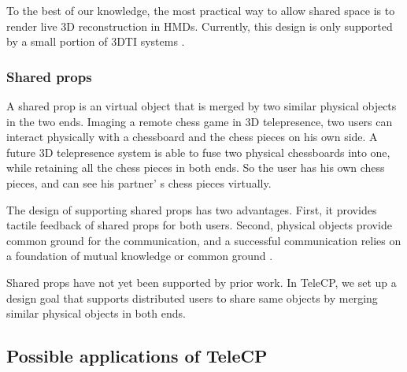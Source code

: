 To the best of our knowledge, the most practical way to allow shared space is to render live 3D reconstruction in HMDs. Currently, this design is only supported by a small portion of 3DTI systems \cite{orts2016holoportation, maimone2013general, lindlbauer2018remixed, smith2018communication}.

\subsubsection{Shared props}

A shared prop is an virtual object that is merged by two similar physical objects in the two ends. Imaging a remote chess game in 3D telepresence, two users can  interact physically with a chessboard and the chess pieces on his own side. A future 3D telepresence system is able to fuse two physical chessboards into one, while retaining all the chess pieces in both ends. So the user has his own chess pieces, and can see his partner' s chess pieces virtually.

The design of supporting shared props has two advantages. First, it provides tactile feedback of shared props for both  users. Second, physical objects provide common ground for the communication, and a successful communication relies on a foundation of mutual knowledge or common ground \cite{clark1981definite, clark1990referring}.

Shared props have not yet been supported by prior work. In TeleCP, we set up a design goal that supports distributed users to share same objects by merging similar physical objects in both ends.


\subsection{Possible applications of TeleCP}

